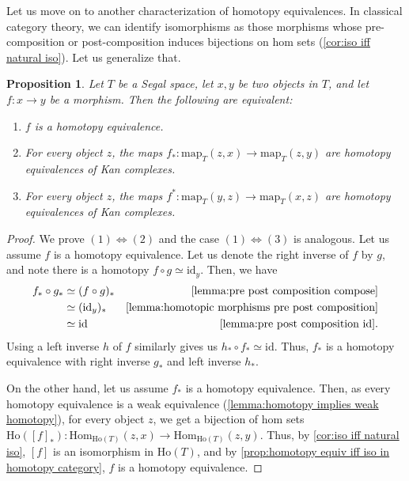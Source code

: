 \documentclass[11pt, a4paper]{amsart}
\newcommand{\Hom}{\mathrm{Hom}}
\newcommand{\map}{\mathrm{map}}
\newcommand{\id}{\mathrm{id}}
\newcommand{\Ho}{\mathrm{Ho}}
\newtheorem{proposition}[equation]{Proposition}
\theoremstyle{definition}
\theoremstyle{remark}
\numberwithin{equation}{section}
\begin{document}
Let us move on to another characterization of homotopy equivalences. In classical category theory, we can identify isomorphisms as those morphisms whose pre-composition or post-composition induces bijections on hom sets (\cref{cor:iso iff natural iso}). Let us generalize that.

\begin{proposition} \label{prop:pre post composition homotopy equivalence}
  Let $T$ be a Segal space, let $x,y$ be two objects in $T$, and let $f\colon x \to y$ be a morphism. Then the following are equivalent:
\begin{enumerate}[leftmargin=*]
  \item $f$ is a homotopy equivalence.
  \item For every object $z$, the maps $f_*\colon\map_T(z,x) \to \map_T(z,y)$ are homotopy equivalences of Kan complexes.
  \item For every object $z$, the maps $f^*\colon\map_T(y,z) \to \map_T(x,z)$ are homotopy equivalences of Kan complexes.
\end{enumerate}
\end{proposition}

\begin{proof}
  We prove $(1) \Leftrightarrow (2)$ and the case $(1) \Leftrightarrow (3)$ is analogous. Let us assume $f$ is a homotopy equivalence. Let us denote the right inverse of $f$ by $g$, and note there is a homotopy $f \circ g \simeq \id_y$. Then, we have 
  \begin{align*}
    f_* \circ g_* & \simeq (f \circ g)_* & \text{\cref{lemma:pre post composition compose}} \\  
      & \simeq (\id_y)_* & \text{\cref{lemma:homotopic morphisms pre post composition}}  \\  
      & \simeq \id & \text{\cref{lemma:pre post composition id}}.
   \end{align*}
   Using a left inverse $h$ of $f$ similarly gives us $h_* \circ f_* \simeq \id$. Thus, $f_*$ is a homotopy equivalence with right inverse $g_*$ and left inverse $h_*$.

   On the other hand, let us assume $f_*$ is a homotopy equivalence. Then, as every homotopy equivalence is a weak equivalence (\cref{lemma:homotopy implies weak homotopy}), for every object $z$, we get a bijection of hom sets $\Ho ([f]_*)\colon \Hom_{\Ho (T)}(z,x) \to \Hom_{\Ho (T)}(z,y)$. Thus, by \cref{cor:iso iff natural iso}, $[f]$ is an isomorphism in $\Ho(T)$, and by \cref{prop:homotopy equiv iff iso in homotopy category}, $f$ is a homotopy equivalence.
\end{proof}
\end{document}
